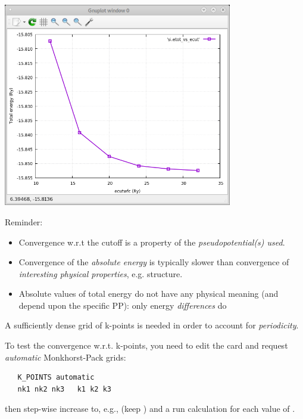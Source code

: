 \documentclass[landscape]{foils}
\def\red{\color{red}}
\begin{document}
%
\begin{center}
\includegraphics[width=10cm]{figs/ecut.png}
\end{center}
\vspace{-2cm}
{\red Reminder:}
\begin{itemize}
\item Convergence w.r.t the cutoff is a property of the {\em pseudopotential(s) used}.
\item 
Convergence of the {\em absolute energy} is typically slower than convergence of
{\em interesting physical properties}, e.g. structure.
\item 
Absolute values of total energy do not have any physical meaning 
(and depend upon the specific PP): only energy {\em differences} do
\end{itemize}

%
A sufficiently dense grid of k-points is needed in order to account
for {\em periodicity}.

To test the convergence w.r.t. k-points, you need to edit
the  card and request {\em automatic} Monkhorst-Pack
grids:
%
{\cardcolor
\begin{verbatim}
   K_POINTS automatic
   nk1 nk2 nk3   k1 k2 k3
\end{verbatim}
}
then step-wise increase  to, e.g., 
(keep ) and a run  calculation for each
value of .
\end{document}
